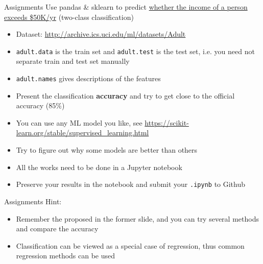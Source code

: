 \documentclass{../TexTemplate/myslide}
\begin{document}
\begin{frame}[fragile]{Assignments}
Use pandas \& sklearn to predict \underline{whether the income of a person exceeds \$50K/yr} (two-class classification)
\begin{itemize}
	\item Dataset: \url{http://archive.ics.uci.edu/ml/datasets/Adult}
	\item \verb'adult.data' is the train set and \verb'adult.test' is the test set, i.e. you need not separate train and test set manually
	\item \verb'adult.names' gives descriptions of the features
	\item Present the classification \textbf{accuracy} and try to get close to the official accuracy (85\%)
	\item You can use any ML model you like, see \url{https://scikit-learn.org/stable/supervised_learning.html}
	\item Try to figure out why some models are better than others
	\item All the works need to be done in a Jupyter notebook
	\item Preserve your results in the notebook and submit your \verb'.ipynb' to Github
\end{itemize}
\end{frame}

\begin{frame}{Assignments}
Hint:
\begin{itemize}
	\item Remember the proposed \hyperlink{hint}{} in the former slide, and you can try several methods and compare the accuracy
	\item Classification can be viewed as a special case of regression, thus common regression methods can be used
\end{itemize}
\end{frame}
\end{document}
